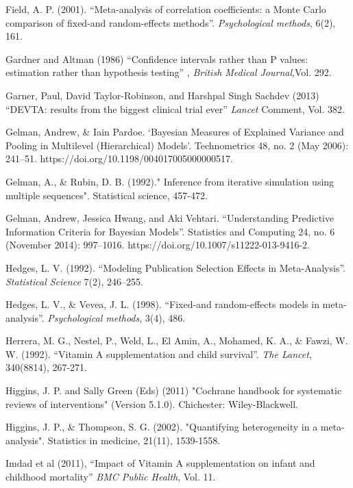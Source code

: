 \documentclass[12pt]{article}
\begin{document}
\begin{thebibliography}{99}
 Field, A. P. (2001). ``Meta-analysis of correlation coefficients: a Monte Carlo comparison of fixed-and random-effects methods''. \emph{Psychological methods}, 6(2), 161.

 Gardner and Altman (1986) ``Confidence intervals rather than P values: estimation rather than hypothesis testing'' , \emph{British Medical Journal},Vol. 292.

 Garner, Paul, David Taylor-Robinson, and Harshpal Singh Sachdev (2013) ``DEVTA: results from the biggest clinical trial ever'' \emph{Lancet} Comment, Vol. 382.

 Gelman, Andrew, \& Iain Pardoe. ‘Bayesian Measures of Explained Variance and Pooling in Multilevel (Hierarchical) Models’. Technometrics 48, no. 2 (May 2006): 241–51. https://doi.org/10.1198/004017005000000517.

 Gelman, A., \& Rubin, D. B. (1992)." Inference from iterative simulation using multiple sequences". Statistical science, 457-472.

 Gelman, Andrew, Jessica Hwang, and Aki Vehtari. ``Understanding Predictive Information Criteria for Bayesian Models''. Statistics and Computing 24, no. 6 (November 2014): 997–1016. https://doi.org/10.1007/s11222-013-9416-2.

 Hedges, L. V. (1992). ``Modeling Publication Selection Effects in Meta-Analysis''. \emph{Statistical Science} 7(2), 246--255.

 Hedges, L. V., \& Vevea, J. L. (1998). ``Fixed-and random-effects models in meta-analysis''. \emph{Psychological methods}, 3(4), 486.


 Herrera, M. G., Nestel, P., Weld, L., El Amin, A., Mohamed, K. A., \& Fawzi, W. W. (1992). ``Vitamin A supplementation and child survival''. \emph{The Lancet}, 340(8814), 267-271.

 Higgins, J. P. and Sally Green (Eds) (2011) "Cochrane handbook for systematic reviews of interventions" (Version 5.1.0). Chichester: Wiley-Blackwell.

 Higgins, J. P., \& Thompson, S. G. (2002). "Quantifying heterogeneity in a meta-analysis". Statistics in medicine, 21(11), 1539-1558.

 Imdad et al (2011), ``Impact of Vitamin A supplementation on infant and childhood mortality'' \emph{BMC Public Health}, Vol. 11.


\end{thebibliography}
\end{document}
